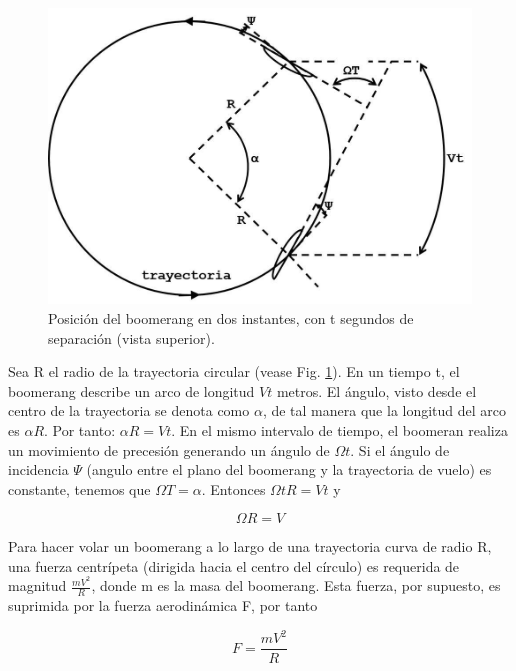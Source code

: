 		\begin{figure}[ht]
		\begin{center}
		\includegraphics[scale=0.3]{imagenes/3-boomerang/TrayectoriaCircular.png}
		\caption{Posición del boomerang en dos instantes, con t segundos de separación (vista superior).}
		\label{fig11}
		\end{center}
		\end{figure}


	Sea R el radio de la trayectoria circular (vease Fig. \ref{fig11}). En un tiempo t, el boomerang describe un arco de longitud $Vt$ metros. El ángulo, visto desde el centro de la trayectoria se denota como $\alpha$, de tal manera que la longitud del arco es $\alpha R$. Por tanto: $\alpha R = Vt$. En el mismo intervalo de tiempo, el boomeran realiza un movimiento de precesión generando un ángulo de $\Omega t$. Si el ángulo de incidencia $\Psi$ (angulo entre el plano del boomerang y la trayectoria de vuelo) es constante, tenemos que $\Omega T = \alpha$. Entonces $\Omega t R = V t$ y

		\begin{equation}
		\Omega R = V
		\label{ec2}
		\end{equation} %

	Para hacer volar un boomerang a lo largo de una trayectoria curva de radio R, una fuerza centrípeta (dirigida hacia el centro del círculo) es requerida de magnitud $\frac{m V^{2}}{R}$, donde m es la masa del boomerang. Esta fuerza, por supuesto, es suprimida por la fuerza aerodinámica F, por tanto

		\begin{equation}
		F = \frac{m V^{2}}{R}
		\label{ec3}
		\end{equation} %

